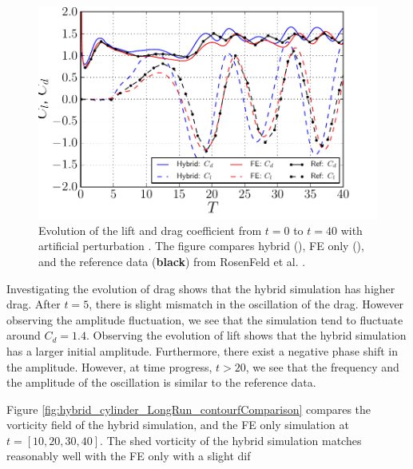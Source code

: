 	\begin{figure}[!p]
	\showthe\columnwidth
	\centering
	\includegraphics[width=0.6\linewidth]{./figures/hybrid/isc/hybrid_cylinder_LongRun_liftDrag.pdf}
	\caption{Evolution of the lift and drag coefficient from $t=0$ to $t=40$ with artificial perturbation \cite{Lecointe1984}. The figure compares hybrid ({}), FE only ({}), and the reference data (\textbf{black}) from RosenFeld et al. \cite{MosheRosenFeldDochanKwak1991}.}
	\label{fig:hybrid_cylinder_LongRun_liftDrag}
	\end{figure}

Investigating the evolution of drag shows that the hybrid simulation has higher drag. After $t=5$, there is slight mismatch in the oscillation of the drag. However observing the amplitude fluctuation, we see that the simulation tend to fluctuate around $C_d=1.4$. Observing the evolution of lift shows that the hybrid simulation has a larger initial amplitude. Furthermore, there exist a negative phase shift in the amplitude. However, at time progress, $t>20$, we see that the frequency and the amplitude of the oscillation is similar to the reference data.

Figure \ref{fig:hybrid_cylinder_LongRun_contourfComparison} compares the vorticity field of the hybrid simulation, and the FE only simulation at $t=[10,20,30,40]$. The shed vorticity of the hybrid simulation matches reasonably well with the FE only with a slight dif

